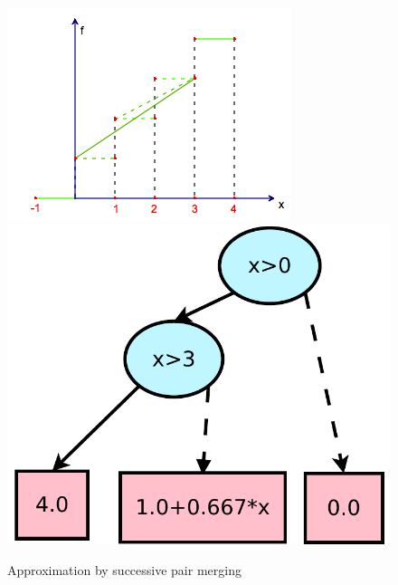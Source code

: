 \begin{figure}[!ht]
{\begin{minipage}{.25\textwidth}
	 \includegraphics[width=\textwidth]{Figures/stepfun/succ3.png}
	\end{minipage}
	\begin{minipage}{.2\textwidth}
	\includegraphics[width=\textwidth]{Figures/xadds/succ3.pdf}
	\end{minipage}
	 \label{step2}
}
\caption{ Approximation by successive pair merging}
 \label{fig:steplining}
\end{figure}

